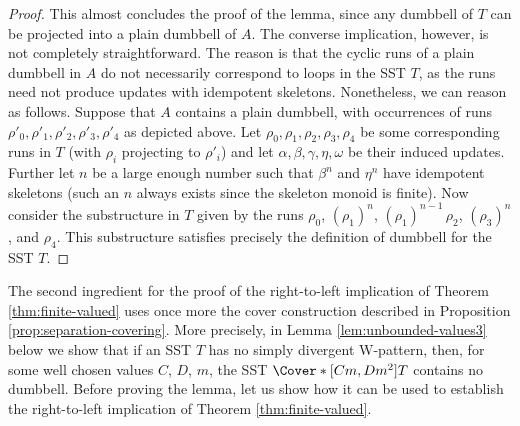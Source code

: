 \documentclass{article}
\begin{document}
\begin{proof}
This almost concludes the proof of the lemma, since any dumbbell 
of $T$ can be projected into a plain dumbbell of $A$.
The converse implication, however, is not completely straightforward.
The reason is that the cyclic runs of a plain dumbbell in $A$
do not necessarily correspond to loops in the SST $T$, 
as the runs need not produce updates 
with idempotent skeletons.
Nonetheless, we can reason as follows.
Suppose that $A$ contains a plain dumbbell, 
with occurrences of runs $\rho'_0,\rho'_1,\rho'_2,\rho'_3,\rho'_4$ 
as depicted above.
Let $\rho_0,\rho_1,\rho_2,\rho_3,\rho_4$ be some
corresponding runs in $T$ (with $\rho_i$ projecting to $\rho'_i$) and let 
$\alpha,\beta,\gamma,\eta,\omega$ be their induced updates.
Further let $n$ be a large enough number such that
$\beta^n$ and $\eta^n$ have idempotent skeletons
(such an $n$ always exists since the skeleton monoid
is finite).
Now consider the substructure in $T$ given by the runs 
$\rho_0$, %
$(\rho_1)^n$, %
$(\rho_1)^{n-1} \, \rho_2$, %
$(\rho_3)^n$, %
and
$\rho_4$. %
This substructure satisfies precisely the definition 
of dumbbell for the SST $T$.
\end{proof}

%



The second ingredient for the proof of the right-to-left 
implication of Theorem \ref{thm:finite-valued}
uses once more the cover construction 
described in Proposition \ref{prop:separation-covering}.
More precisely, in Lemma \ref{lem:unbounded-values3} below
we show that if an SST $T$ has no simply divergent W-pattern, 
then, for some well chosen values $C$, $D$, $m$, 
the SST $\Cover*[Cm,Dm^2]{T}$ contains no dumbbell.
Before proving the lemma, let us show how it can be used 
to establish the right-to-left implication of Theorem \ref{thm:finite-valued}.
\end{document}
